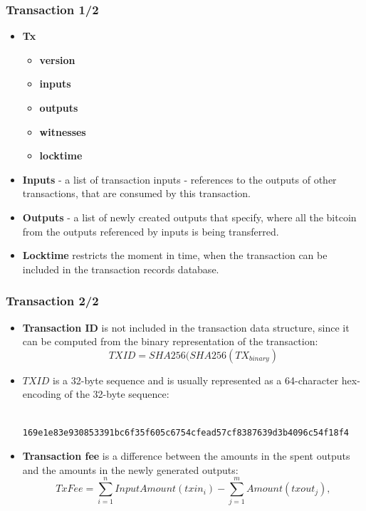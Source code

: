 \documentclass{beamer}
\begin{document}
\begin{frame}
  \frametitle{Transaction 1/2}
  \begin{itemize}
  \item \textbf{Tx}
    \begin{itemize}
    \item \textbf{version}
    \item \textbf{inputs}
    \item \textbf{outputs}
    \item \textbf{witnesses}
    \item \textbf{locktime}
    \end{itemize}
  \item \textbf{Inputs} - a list of transaction inputs - references to the
    outputs of other transactions, that are consumed by this transaction.
  \item \textbf{Outputs} - a list of newly created outputs that specify, where
    all the bitcoin from the outputs referenced by inputs is being transferred.
  \item \textbf{Locktime} restricts the moment in time, when the transaction can
    be included in the transaction records database.
  \end{itemize}
\end{frame}

\begin{frame}[fragile]
  \frametitle{Transaction 2/2}
  \begin{itemize}
  \item \textbf{Transaction ID} is not included in the transaction data
    structure, since it can be computed from the binary representation of the
    transaction:
    $$TXID = SHA256(SHA256(TX_{binary})$$
  \item $TXID$ is a 32-byte sequence and is usually represented as a
    64-character hex-encoding of the 32-byte sequence:
    \begin{verbatim}
      169e1e83e930853391bc6f35f605c6754cfead57cf8387639d3b4096c54f18f4
    \end{verbatim}
  \item \textbf{Transaction fee} is a difference between the amounts in the
    spent outputs and the amounts in the newly generated outputs:
    $$TxFee = \sum_{i=1}^n InputAmount(txin_i) - \sum_{j=1}^m Amount(txout_j),$$
  \end{itemize}
\end{frame}
\end{document}

